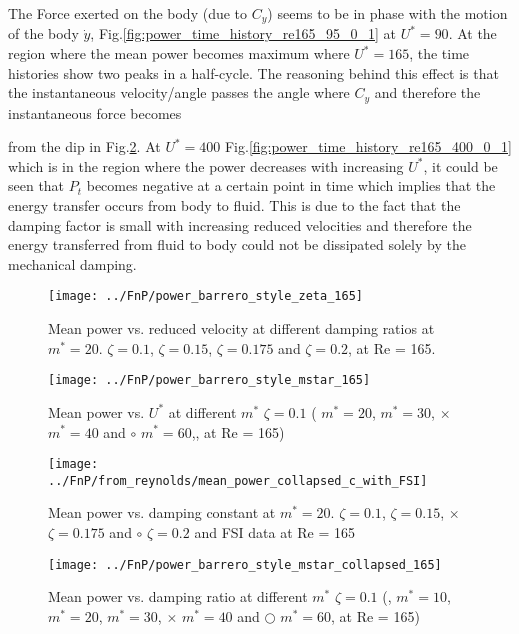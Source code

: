 The Force exerted on the body (due to $C_y$) seems to be in phase with the motion of the body $\dot{y}$, Fig.\ref{fig:power_time_history_re165_95_0_1} at $U^*=90$. At the region where the mean power becomes maximum where $U^*=165$, the time histories show two peaks in a half-cycle. The reasoning behind this effect is that the instantaneous velocity/angle passes the angle where $C_y$ and therefore the instantaneous force becomes 

 from the dip in Fig.\ref{fig:power_barrero_style_mstar_165}. At $U^*=400$ Fig.\ref{fig:power_time_history_re165_400_0_1} which is in the region where the power decreases with increasing $U^*$, it could be seen that $P_t$ becomes negative at a certain point in time which implies that the energy transfer occurs from body to fluid. This is due to the fact that the damping factor is small with increasing  reduced velocities and therefore the energy transferred from fluid to body could not be dissipated solely by the mechanical damping.


   

\begin{figure}
\centering
\texttt{[image: ../FnP/power\_barrero\_style\_zeta\_165]}
\caption{Mean power vs. reduced velocity at different damping ratios at $m^*=20$.  $ \zeta = 0.1$,  $\zeta = 0.15$,  $\zeta = 0.175$ and  $\zeta = 0.2$, at Re = 165.}
\label{fig:power_barrero_style_zeta_165}
\end{figure}

\begin{figure}
\centering
\texttt{[image: ../FnP/power\_barrero\_style\_mstar\_165]}
\caption{Mean power vs. $U^*$ at different $m^*$ $\zeta=0.1$ ( $m^*=20$,  $m^*=30$, $\times$ $m^*=40$ and  $\circ$ $m^* = 60$,, at Re = 165)} 
\label{fig:power_barrero_style_mstar_165}
\end{figure}

\begin{figure}[htbp]
\centering
\texttt{[image: ../FnP/from\_reynolds/mean\_power\_collapsed\_c\_with\_FSI]}
\caption{Mean power vs. damping constant at $m^*=20$.  $ \zeta = 0.1$,  $\zeta = 0.15$,   $\times$ $\zeta = 0.175$ and $\circ$ $\zeta = 0.2$ and  FSI data at Re = 165 }
\label{fig:mean_power_collapsed_c_with_FSI}
\end{figure}



\begin{figure}
\centering
\texttt{[image: ../FnP/power\_barrero\_style\_mstar\_collapsed\_165]}
\caption{Mean power vs. damping ratio at different $m^*$ $\zeta=0.1$ (, $m^*=10$, $m^*=20$,  $m^*=30$, $\times$ $m^*=40$ and  $\bigcirc$ $m^* = 60$, at Re = 165) } 
\label{fig:power_barrero_style_mstar_collapsed_165}
\end{figure}

